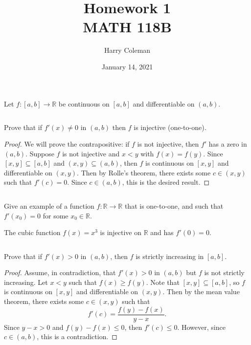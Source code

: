 \documentclass[12pt]{article}
\title{Homework 1\\
    \large MATH 118B
}
\author{Harry Coleman}
\date{January 14, 2021}
\newenvironment{problem}
    {\begin{lrbox}{\mybox}\begin{minipage}{0.98\textwidth}}
    {\end{minipage}\end{lrbox}\begin{center}\framebox[\textwidth]{\usebox{\mybox}}\end{center}}
\theoremstyle{definition}
\newcommand{\R}{\mathbb{R}}
\begin{document}
\maketitle

\section{}
\begin{problem}
    Let $f:[a,b]\to \R$ be continuous on $[a,b]$ and differentiable on $(a,b)$.
\end{problem}

\subsection{}
\begin{problem}
    Prove that if $f'(x)\ne 0$ in $(a,b)$ then $f$ is injective (one-to-one).
\end{problem}

\begin{proof}
    We will prove the contrapositive: if $f$ is not injective, then $f'$ has a zero in $(a,b)$. Suppose $f$ is not injective and $x < y$ with $f(x) = f(y)$. Since $[x, y] \subseteq [a, b]$ and $(x, y) \subseteq (a, b)$, then $f$ is continuous on $[x, y]$ and differentiable on $(x, y)$. Then by Rolle's theorem, there exists some $c \in (x, y)$ such that $f'(c) = 0$. Since $c \in (a, b)$, this is the desired result.
\end{proof}

\subsection{}
\begin{problem}
    Give an example of a function $f:\R\to \R$ that is one-to-one, and such that $f'(x_0)=0$ for some $x_0\in \R$.
\end{problem}

The cubic function $f(x) = x^3$ is injective on $\R$ and has $f'(0) = 0$.
 
\subsection{}
\begin{problem}
    Prove that if $f'(x)>0$ in $(a,b)$, then $f$ is strictly increasing in $[a,b]$. 
\end{problem}

\begin{proof}
    Assume, in contradiction, that $f'(x) > 0$ in $(a, b)$ but $f$ is not strictly increasing. Let $x < y$ such that $f(x) \geq f(y)$. Note that $[x, y] \subseteq [a, b]$, so $f$ is continuous on $[x, y]$ and differentiable on $(x, y)$. Then by the mean value theorem, there exists some $c \in (x, y)$ such that
    \[
        f'(c) = \frac{f(y) - f(x)}{y - x}.
    \]
    Since $y - x > 0$ and $f(y) - f(x) \leq 0$, then $f'(c) \leq 0$. However, since $c \in (a,b)$, this is a contradiction. 
    
\end{proof}
\end{document}

